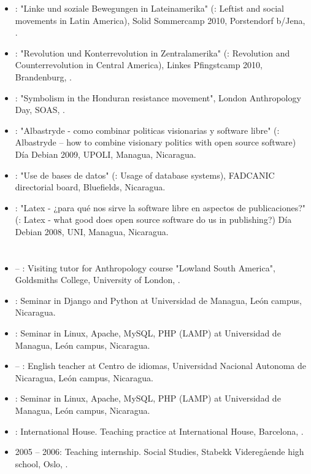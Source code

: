 \begin{itemize}
\item {}: "Linke und soziale Bewegungen in Lateinamerika" (\english: Leftist and social movements in Latin America), Solid Sommercamp 2010, Porstendorf b/Jena, \Germany.

\item {}: "Revolution und Konterrevolution in Zentralamerika" (\english: Revolution and Counterrevolution in Central America), Linkes Pfingstcamp 2010, Brandenburg, \Germany.

\item {}: "Symbolism in the Honduran resistance movement", London Anthropology Day, SOAS, \UK.

\item {}: "Albastryde - como combinar politicas visionarias y software libre" (\english: Albastryde – how to combine visionary politics with open source software) Día Debian 2009, UPOLI, Managua, Nicaragua.

\item {}: "Use de bases de datos" (\english: Usage of database systems), FADCANIC directorial board, Bluefields, Nicaragua.

\item {}: "Latex - ¿para qué nos sirve la software libre en aspectos de publicaciones?" (\english: Latex - what good does open source software do us in publishing?) Día Debian 2008, UNI, Managua, Nicaragua.
\end{itemize}


\section*{\teachingexperience}

\begin{itemize}
\item {} – : Visiting tutor for Anthropology course "Lowland South America", Goldsmiths College, University of London, \UK.

\item {}: Seminar in Django and Python at Universidad de Managua, León campus, Nicaragua.

\item {}: Seminar in Linux, Apache, MySQL, PHP (LAMP) at Universidad de Managua, León campus, Nicaragua.

\item {} – : English teacher at Centro de idiomas, Universidad Nacional Autonoma de Nicaragua, León campus, Nicaragua.

\item {}: Seminar in Linux, Apache, MySQL, PHP (LAMP) at Universidad de Managua, León campus, Nicaragua.

\item {}: International House. Teaching practice at International House, Barcelona, \Spain.

\item 2005 – 2006: Teaching internship. \english \und Social Studies, Stabekk Videregående high school, Oslo, \Norway.

\end{itemize}
